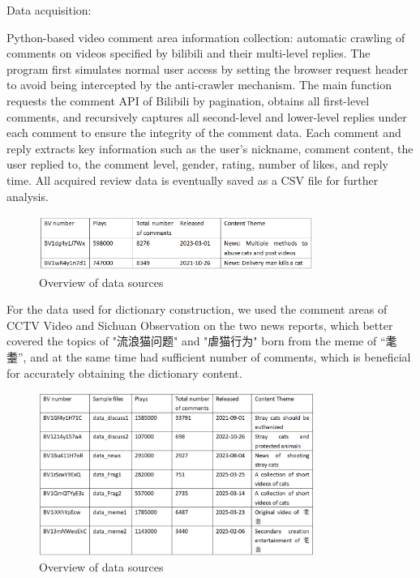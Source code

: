\documentclass[12pt,a4paper]{ctexart}
\theoremstyle{MyLineTheoremStyle}
\theoremstyle{MyBlockTheoremStyle}
\theoremstyle{MySubsubsectionStyle}
\begin{document}
Data acquisition:

Python-based video comment area information collection: automatic crawling of comments on videos specified by bilibili and their multi-level replies. The program first simulates normal user access by setting the browser request header to avoid being intercepted by the anti-crawler mechanism. The main function requests the comment API of Bilibili by pagination, obtains all first-level comments, and recursively captures all second-level and lower-level replies under each comment to ensure the integrity of the comment data. Each comment and reply extracts key information such as the user's nickname, comment content, the user replied to, the comment level, gender, rating, number of likes, and reply time. All acquired review data is eventually saved as a CSV file for further analysis.

\begin{figure}[htbp]
    \centering
    \includegraphics[width=0.8\textwidth]{img/data_sources_1.png}
    \caption{Overview of data sources}
    \label{fig:data_sources_1}
\end{figure}
\newpage

For the data used for dictionary construction, we used the comment areas of CCTV Video and Sichuan Observation on the two news reports, which better covered the topics of "流浪猫问题" and "虐猫行为" born from the meme of “耄耋”, and at the same time had sufficient number of comments, which is beneficial for accurately obtaining the dictionary content.

\begin{figure}[htbp]
    \centering
    \includegraphics[width=0.8\textwidth]{img/data_sources_2.png}
    \caption{Overview of data sources}
    \label{fig:data_sources_2}
\end{figure}
\newpage
\end{document}
